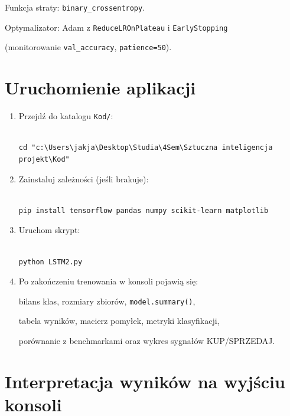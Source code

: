 \documentclass[12pt,a4paper]{report}
\begin{document}
Funkcja straty: \texttt{binary\_crossentropy}.

Optymalizator: Adam z \texttt{ReduceLROnPlateau} i \texttt{EarlyStopping}

(monitorowanie \texttt{val\_accuracy}, \texttt{patience=50}).



\section{Uruchomienie aplikacji}



\begin{enumerate}

    \item Przejdź do katalogu \texttt{Kod/}:

\begin{lstlisting}

cd "c:\Users\jakja\Desktop\Studia\4Sem\Sztuczna inteligencja projekt\Kod"

\end{lstlisting}

    \item Zainstaluj zależności (jeśli brakuje):

\begin{lstlisting}

pip install tensorflow pandas numpy scikit-learn matplotlib

\end{lstlisting}

    \item Uruchom skrypt:

\begin{lstlisting}

python LSTM2.py

\end{lstlisting}

    \item Po zakończeniu trenowania w konsoli pojawią się:

          bilans klas, rozmiary zbiorów, \texttt{model.summary()},

          tabela wyników, macierz pomyłek, metryki klasyfikacji,

          porównanie z benchmarkami oraz wykres sygnałów KUP/SPRZEDAJ.

\end{enumerate}



\section{Interpretacja wyników na wyjściu konsoli}
\end{document}
